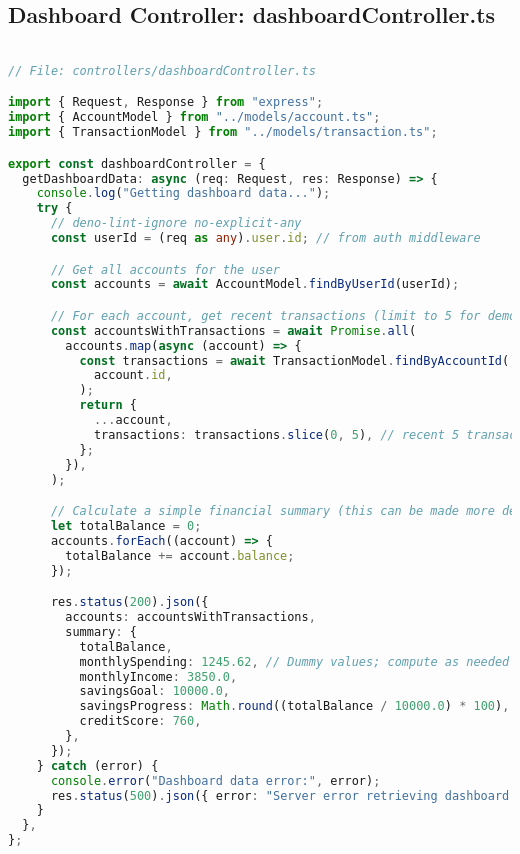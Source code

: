 \subsection{Dashboard Controller: dashboardController.ts}
\begin{lstlisting}[language=TypeScript]

// File: controllers/dashboardController.ts

import { Request, Response } from "express";
import { AccountModel } from "../models/account.ts";
import { TransactionModel } from "../models/transaction.ts";

export const dashboardController = {
  getDashboardData: async (req: Request, res: Response) => {
    console.log("Getting dashboard data...");
    try {
      // deno-lint-ignore no-explicit-any
      const userId = (req as any).user.id; // from auth middleware

      // Get all accounts for the user
      const accounts = await AccountModel.findByUserId(userId);

      // For each account, get recent transactions (limit to 5 for demonstration)
      const accountsWithTransactions = await Promise.all(
        accounts.map(async (account) => {
          const transactions = await TransactionModel.findByAccountId(
            account.id,
          );
          return {
            ...account,
            transactions: transactions.slice(0, 5), // recent 5 transactions
          };
        }),
      );

      // Calculate a simple financial summary (this can be made more detailed)
      let totalBalance = 0;
      accounts.forEach((account) => {
        totalBalance += account.balance;
      });

      res.status(200).json({
        accounts: accountsWithTransactions,
        summary: {
          totalBalance,
          monthlySpending: 1245.62, // Dummy values; compute as needed
          monthlyIncome: 3850.0,
          savingsGoal: 10000.0,
          savingsProgress: Math.round((totalBalance / 10000.0) * 100),
          creditScore: 760,
        },
      });
    } catch (error) {
      console.error("Dashboard data error:", error);
      res.status(500).json({ error: "Server error retrieving dashboard data" });
    }
  },
};

\end{lstlisting}

